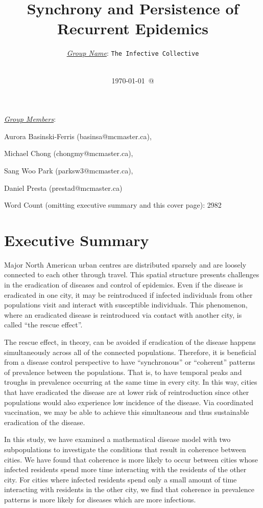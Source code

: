\documentclass[12pt]{article}
\title{Synchrony and Persistence of Recurrent Epidemics}
\author{ \underline{\emph{Group Name}}: \texttt{{\color{blue}The Infective Collective}}\\
\\}
\date{\today\ @ \thistime}
\begin{document}
\vfill
\maketitle 
\noindent

\underline{\emph{Group Members}}:
\begin{itemize}
{\color{blue}
\item Aurora Basinski-Ferris (basinsa@mcmaster.ca), 
\item Michael Chong (chongmy@mcmaster.ca), 
\item Sang Woo Park (parksw3@mcmaster.ca), 
\item Daniel Presta (prestad@mcmaster.ca)}
\end{itemize}

\noindent
Word Count (omitting executive summary and this cover page): 2982

\vfill
\newpage 
\linenumbers

\section*{Executive Summary}
Major North American urban centres are distributed sparsely and are loosely connected to each other through travel. This spatial structure presents challenges in the eradication of diseases and control of epidemics. Even if the disease is eradicated in one city, it may be reintroduced if infected individuals from other populations visit and interact with susceptible individuals. This phenomenon, where an eradicated disease is reintroduced via contact with another city, is called “the rescue effect”.

The rescue effect, in theory, can be avoided if eradication of the disease happens simultaneously across all of the connected populations. Therefore, it is beneficial from a disease control perspective to have “synchronous” or “coherent” patterns of prevalence between the populations. That is, to have temporal peaks and troughs in prevalence occurring at the same time in every city. In this way, cities that have eradicated the disease are at lower risk of reintroduction since other populations would also experience low incidence of the disease. Via coordinated vaccination, we may be able to achieve this simultaneous and thus sustainable eradication of the disease.

In this study, we have examined a mathematical disease model with two subpopulations to investigate the conditions that result in coherence between cities. We have found that coherence is more likely to occur between cities whose infected residents spend more time interacting with the residents of the other city. For cities where infected residents spend only a small amount of time interacting with residents in the other city, we find that coherence in prevalence patterns is more likely for diseases which are more infectious. 
\end{document}
